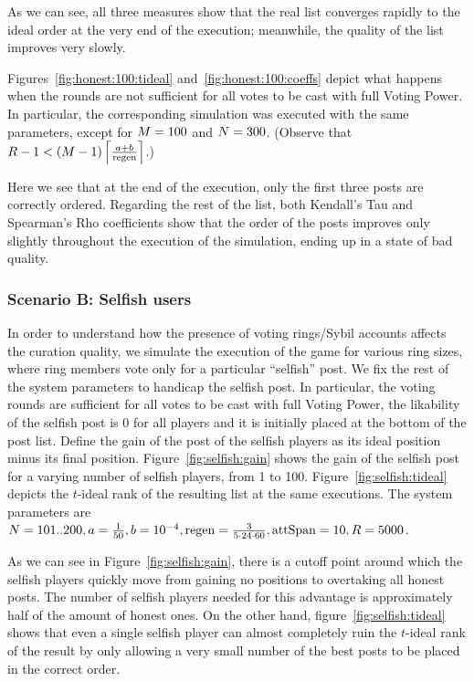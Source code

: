       As we can see, all three measures show that the real list converges
      rapidly to the ideal order at the very end of the execution; meanwhile,
      the quality of the list improves very slowly.

      Figures~\ref{fig:honest:100:tideal} and~\ref{fig:honest:100:coeffs} depict
      what happens when the rounds are not sufficient for all votes to be cast
      with full Voting Power. In particular, the corresponding simulation was
      executed with the same parameters, except for $\postlen = 100$ and
      $\playerlen = 300$. (Observe that $\rounds - 1 < \left(\postlen -
      1\right)\ceil*{\frac{a + b}{\regen}}$.)

      Here we see that at the end of the execution, only the first three posts
      are correctly ordered. Regarding the rest of the list, both Kendall's Tau
      and Spearman's Rho coefficients show that the order of the posts improves
      only slightly throughout the execution of the simulation, ending up in a
      state of bad quality.

    \subsubsection{Scenario B: Selfish users}
      In order to understand how the presence of voting rings/Sybil accounts
      affects the curation quality, we simulate the execution of the game for
      various ring sizes, where ring members vote only for a particular
      ``selfish'' post. We fix the rest of the system parameters to handicap the
      selfish post. In particular, the voting rounds are sufficient for all
      votes to be cast with full Voting Power, the likability of the selfish
      post is 0 for all players and it is initially placed at the bottom of the
      post list. Define the gain of the post of the selfish players as its ideal
      position minus its final position. Figure~\ref{fig:selfish:gain} shows the
      gain of the selfish post for a varying number of selfish players, from 1
      to 100.  Figure~\ref{fig:selfish:tideal} depicts the $t$-ideal rank of the
      resulting list at the same executions. The system parameters are
      $\playerlen = 101 .. 200, a = \frac{1}{50}, b = 10^{-4}, \regen =
      \frac{3}{5 \cdot 24 \cdot 60}, \attspan = 10, \rounds = 5000$.

      As we can see in Figure~\ref{fig:selfish:gain}, there is a cutoff point
      around which the selfish players quickly move from gaining no positions to
      overtaking all honest posts. The number of selfish players needed for this
      advantage is approximately half of the amount of honest ones. On the other
      hand, figure~\ref{fig:selfish:tideal} shows that even a single selfish
      player can almost completely ruin the $t$-ideal rank of the result by
      only allowing a very small number of the best posts to be placed in the
      correct order.
